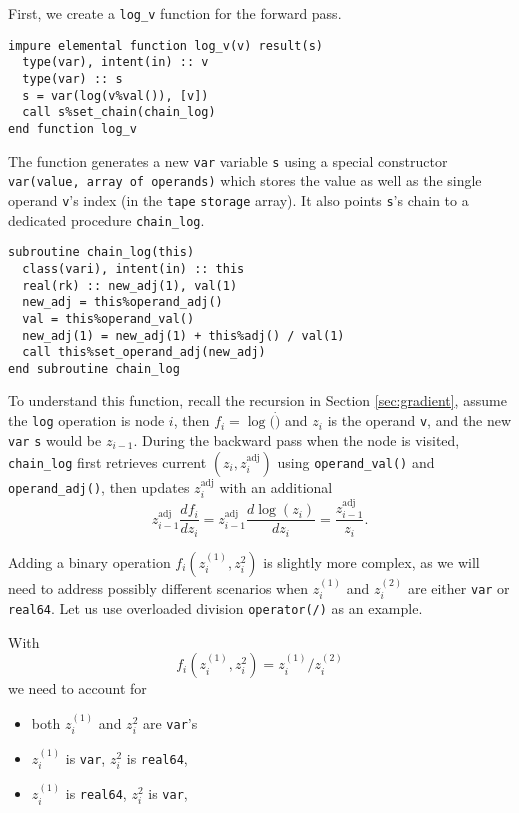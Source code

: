 \documentclass[12pt, reqno, oneside]{amsbook}
\begin{document}
First, we create a \texttt{log\_v} function for the forward pass.
\begin{verbatim}
impure elemental function log_v(v) result(s)
  type(var), intent(in) :: v
  type(var) :: s
  s = var(log(v%val()), [v])
  call s%set_chain(chain_log)
end function log_v
\end{verbatim}
The function generates a new \texttt{var} variable \texttt{s} using a special
constructor \texttt{var(value, array of operands)} which stores the value as
well as the single operand \texttt{v}'s index (in the \texttt{tape} \texttt{storage}
array). It also points \texttt{s}'s chain to a dedicated procedure \texttt{chain\_log}.
\begin{verbatim}
subroutine chain_log(this)
  class(vari), intent(in) :: this
  real(rk) :: new_adj(1), val(1)
  new_adj = this%operand_adj()
  val = this%operand_val()
  new_adj(1) = new_adj(1) + this%adj() / val(1)
  call this%set_operand_adj(new_adj)
end subroutine chain_log
\end{verbatim}
To understand this function, recall the recursion in Section \ref{sec:gradient},
assume the \texttt{log} operation is node \(i\), then \(f_i=\log(\dot)\) and
\(z_i\) is the operand \texttt{v}, and the new \texttt{var} \texttt{s} would be
\(z_{i-1}\). During the backward pass when the node is visited, \texttt{chain\_log} 
first retrieves current \((z_i, z_i^{\text{adj}})\)
using \texttt{operand\_val()} and \texttt{operand\_adj()}, then updates
\(z_i^{\text{adj}}\) with an additional
\begin{equation*}
z_{i-1}^{\text{adj}} \frac{df_i}{dz_i} = z_{i-1}^{\text{adj}}\frac{d\log(z_i)}{dz_i}=\frac{z_{i-1}^{\text{adj}}}{z_i}.
\end{equation*}

Adding a binary operation \(f_i(z_i^{(1)}, z_i^{2})\) is slightly more complex, as we will need to
address possibly different scenarios when \(z_i^{(1)}\) and \(z_i^{(2)}\)
are either \texttt{var} or \texttt{real64}. Let us use overloaded division \texttt{operator(/)} as an example.

With
\begin{equation*}
f_i(z_i^{(1)}, z_i^{2}) = z_i^{(1)} / z_i^{(2)}
\end{equation*}
we need to account for
\begin{itemize}
\item both \(z_i^{(1)}\) and \(z_i^{2}\) are \texttt{var}'s
\item \(z_i^{(1)}\) is \texttt{var}, \(z_i^{2}\) is \texttt{real64},
\item \(z_i^{(1)}\) is \texttt{real64}, \(z_i^{2}\) is \texttt{var},
\end{itemize}
\end{document}

